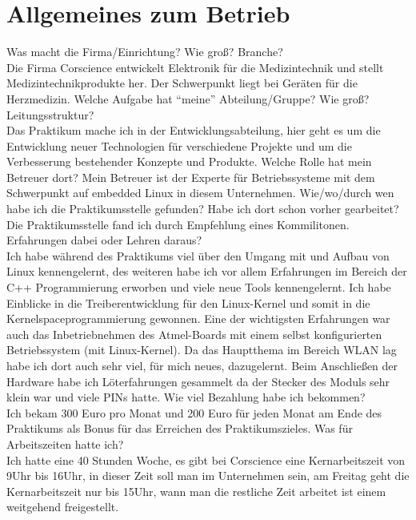 \documentclass[pdftex,12pt,a4paper]{scrreprt}
\begin{document}

\tableofcontents

\begin{abstract}

\end{abstract}

\section{Allgemeines zum Betrieb}
Was macht die Firma/Einrichtung? Wie groß? Branche?\\
Die Firma Corscience entwickelt Elektronik für die Medizintechnik und stellt Medizintechnikprodukte her.
Der Schwerpunkt liegt bei Geräten für die Herzmedizin.
Welche Aufgabe hat "`meine"' Abteilung/Gruppe? Wie groß? Leitungsstruktur?\\
Das Praktikum mache ich in der Entwicklungsabteilung, hier geht es um die Entwicklung neuer Technologien für verschiedene Projekte und um die Verbesserung bestehender Konzepte und Produkte.
Welche Rolle hat mein Betreuer dort?
Mein Betreuer ist der Experte für Betriebssysteme mit dem Schwerpunkt auf embedded Linux in diesem Unternehmen.
Wie/wo/durch wen habe ich die Praktikumsstelle gefunden? Habe ich dort schon vorher gearbeitet?\\
Die Praktikumsstelle fand ich durch Empfehlung eines Kommilitonen.
Erfahrungen dabei oder Lehren daraus?\\
Ich habe während des Praktikums viel über den Umgang mit und Aufbau von Linux kennengelernt, des weiteren habe ich vor allem Erfahrungen im Bereich der C++ Programmierung erworben und viele neue Tools kennengelernt. Ich habe Einblicke in die Treiberentwicklung für den Linux-Kernel und somit in die Kernelspaceprogrammierung gewonnen. Eine der wichtigsten Erfahrungen war auch das Inbetriebnehmen des Atmel-Boards mit einem selbst konfigurierten Betriebssystem (mit Linux-Kernel). Da das Hauptthema im Bereich WLAN lag habe ich dort auch sehr viel, für mich neues, dazugelernt. Beim Anschließen der Hardware habe ich Löterfahrungen gesammelt da der Stecker des Moduls sehr klein war und viele PINs hatte.
Wie viel Bezahlung habe ich bekommen?\\
Ich bekam 300 Euro pro Monat und 200 Euro für jeden Monat am Ende des Praktikums als Bonus für das Erreichen des Praktikumszieles.
Was für Arbeitszeiten hatte ich?\\
Ich hatte eine 40 Stunden Woche, es gibt bei Corscience eine Kernarbeitszeit von 9Uhr bis 16Uhr, in dieser Zeit soll man im Unternehmen sein, am Freitag geht die Kernarbeitszeit nur bis 15Uhr, wann man die restliche Zeit arbeitet ist einem weitgehend freigestellt.
\end{document}
